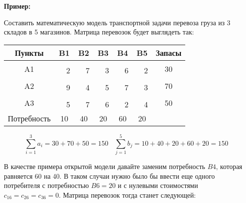 \documentclass[a4paper,12pt]{article}
\begin{document}
	\textbf{Пример:}
	
	Составить математическую модель транспортной задачи перевоза груза из 3 складов в 5 магазинов. Матрица перевозок будет выглядеть так:

	\begin{center}
		\begin{tabular}{|c|c|c|c|c|c|c|c|c|c|c|c}
			\hline
			Пункты & \multicolumn{2}{c|}{B1} & \multicolumn{2}{c|}{B2} & \multicolumn{2}{c|}{B3} & \multicolumn{2}{c|}{B4} & \multicolumn{2}{c|}{B5} & \multicolumn{1}{c|}{Запасы} \\ \hline
			\multirow{2}{*}{A1} & \multicolumn{2}{c|}{\textbf{}} & \multicolumn{2}{c|}{} & \multicolumn{2}{c|}{} & \multicolumn{2}{c|}{} & \multicolumn{2}{c|}{} & \multicolumn{1}{c|}{\multirow{2}{*}{30}} \\ \cline{2-11}
			&  & 2 &  & 7 &  & 3 &  & 6 &  & 2 & \multicolumn{1}{c|}{} \\ \hline
			\multirow{2}{*}{A2} & \multicolumn{2}{c|}{\textbf{}} & \multicolumn{2}{c|}{\textbf{}} & \multicolumn{2}{c|}{} & \multicolumn{2}{c|}{} & \multicolumn{2}{c|}{} & \multicolumn{1}{c|}{\multirow{2}{*}{70}} \\ \cline{2-11}
			&  & 9 &  & 4 &  & 5 &  & 7 &  & 3 & \multicolumn{1}{c|}{} \\ \hline
			\multirow{2}{*}{A3} & \multicolumn{2}{c|}{} & \multicolumn{2}{c|}{\textbf{}} & \multicolumn{2}{c|}{\textbf{}} & \multicolumn{2}{c|}{} & \multicolumn{2}{c|}{} & \multicolumn{1}{c|}{\multirow{2}{*}{50}} \\ \cline{2-11}
			&  & 5 &  & 7 &  & 6 &  & 2 &  & 4 & \multicolumn{1}{c|}{} \\ \hline
			Потребность & \multicolumn{2}{c|}{10} & \multicolumn{2}{c|}{40} & \multicolumn{2}{c|}{20} & \multicolumn{2}{c|}{60} & \multicolumn{2}{c|}{20} &  \\ \cline{1-11}
		\end{tabular}
	\end{center}

	\[
		 \sum\limits_{i=1}^3 a_{i} = 30 + 70 + 50 = 150 \ \ \ \
		 \sum\limits_{j=1}^5 b_{j} = 10 + 40 + 20 + 60 + 20 = 150 
	\]
	
	В качестве примера открытой модели давайте заменим потребность $B4$, которая равняется 60 на 40. В таком случаи нужно было бы ввести еще одного потребителя с потребностью $B6 = 20$ и с нулевыми стоимостями $c_{16} = c_{26} = c_{36} = 0$. Матрица перевозок тогда станет следующей:
	
\end{document}

